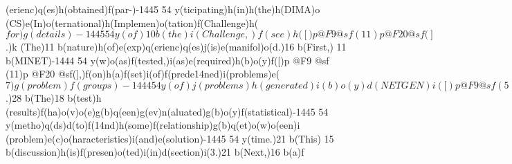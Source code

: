 (erienc)q(es)h(obtained)f(par-)-1445 54 y(ticipating)h(in)h(the)h(DIMA)o
(CS)e(In)o(ternational)h(Implemen)o(tation)f(Challenge)h(\(for)g(details)
-1445 54 y(of)10 b(the)i(Challenge,)f(see)h([)p @F9 @sf(11)p @F20 @sf(]\).)k
(The)11 b(nature)h(of)e(exp)q(erienc)q(es)j(is)e(manifol)o(d.)16 b(First,)
11 b(MINET)-1444 54 y(w)o(as)f(tested,)i(as)e(required)h(b)o(y)f([)p @F9 @sf
(11)p @F20 @sf(],)f(on)h(a)f(set)i(of)f(prede\014ned)i(problems)e(\(7)g
(problem)f(groups)-1444 54 y(of)j(problems)h(generated)i(b)o(y)d(NETGEN)i
([)p @F9 @sf(5)p @F20 @sf(],)d(and)i(8)g(problems)g(from)f(the)h(original)e
(NET-)-1444 54 y(GEN)17 b(set)i(of)e(40)g(problems\).)28 b(The)18 b(test)h
(results)f(ha)o(v)o(e)g(b)q(een)g(ev)n(aluated)g(b)o(y)f(statistical)-1445 
54 y(metho)q(ds)d(to)f(\014nd)h(some)f(relationship)g(b)q(et)o(w)o(een)i
(problem)e(c)o(haracteristics)i(and)e(solution)-1445 54 y(time.)21 b(This)
15 b(discussion)h(is)f(presen)o(ted)i(in)d(section)i(3.)21 b(Next,)16 b(a)f
